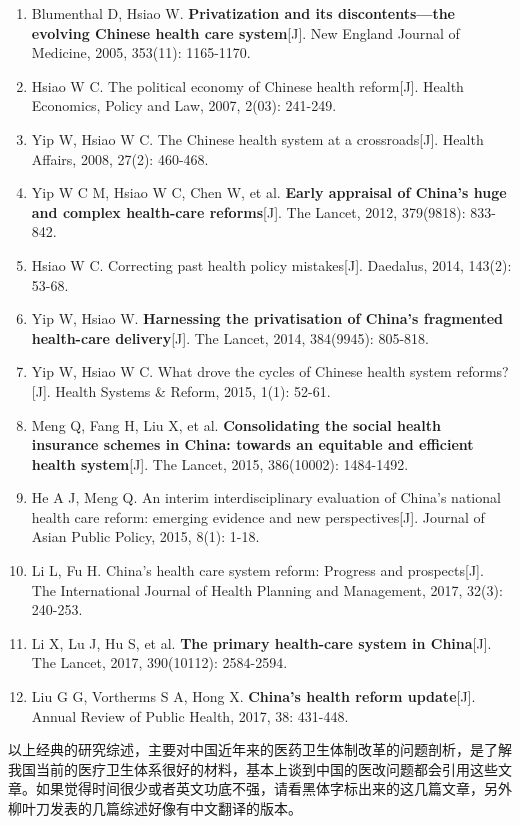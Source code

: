 \documentclass[11pt, a4paper]{article}
\begin{document}
\begin{enumerate}[(1)]
	\item Blumenthal D, Hsiao W. \textbf{Privatization and its discontents—the evolving Chinese health care system}[J]. New England Journal of Medicine, 2005, 353(11): 1165-1170.
	\item Hsiao W C. The political economy of Chinese health reform[J]. Health Economics, Policy and Law, 2007, 2(03): 241-249.
	\item Yip W, Hsiao W C. The Chinese health system at a crossroads[J]. Health Affairs, 2008, 27(2): 460-468.
	\item Yip W C M, Hsiao W C, Chen W, et al. \textbf{Early appraisal of China's huge and complex health-care reforms}[J]. The Lancet, 2012, 379(9818): 833-842.
	\item Hsiao W C. Correcting past health policy mistakes[J]. Daedalus, 2014, 143(2): 53-68.
	\item Yip W, Hsiao W. \textbf{Harnessing the privatisation of China's fragmented health-care delivery}[J]. The Lancet, 2014, 384(9945): 805-818.
	\item Yip W, Hsiao W C. What drove the cycles of Chinese health system reforms?[J]. Health Systems \& Reform, 2015, 1(1): 52-61.
	\item Meng Q, Fang H, Liu X, et al. \textbf{Consolidating the social health insurance schemes in China: towards an equitable and efficient health system}[J]. The Lancet, 2015, 386(10002): 1484-1492.
	\item He A J, Meng Q. An interim interdisciplinary evaluation of China’s national health care reform: emerging evidence and new perspectives[J]. Journal of Asian Public Policy, 2015, 8(1): 1-18.
	\item Li L, Fu H. China's health care system reform: Progress and prospects[J]. The International Journal of Health Planning and Management, 2017, 32(3): 240-253.
	\item Li X, Lu J, Hu S, et al. \textbf{The primary health-care system in China}[J]. The Lancet, 2017, 390(10112): 2584-2594.
	\item Liu G G, Vortherms S A, Hong X. \textbf{China's health reform update}[J]. Annual Review of Public Health, 2017, 38: 431-448.
\end{enumerate}

以上经典的研究综述，主要对中国近年来的医药卫生体制改革的问题剖析，是了解我国当前的医疗卫生体系很好的材料，基本上谈到中国的医改问题都会引用这些文章。如果觉得时间很少或者英文功底不强，请看黑体字标出来的这几篇文章，另外柳叶刀发表的几篇综述好像有中文翻译的版本。
\end{document}

